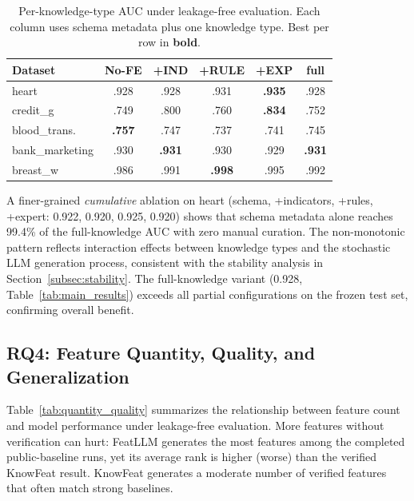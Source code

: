 \begin{table}[t]
\centering
\caption{Per-knowledge-type AUC under leakage-free evaluation. Each column uses schema metadata plus one knowledge type. Best per row in \textbf{bold}.}
\label{tab:pertype}
\small
\renewcommand{\arraystretch}{1.2}
\setlength{\tabcolsep}{3pt}
\begin{tabular}{l c c c c c}
\hline
\textbf{Dataset} & \textbf{No-FE} & \textbf{+IND} & \textbf{+RULE} & \textbf{+EXP} & \textbf{full} \\
\hline
heart              & .928 & .928 & .931 & \textbf{.935} & .928 \\
credit\_g          & .749 & .800 & .760 & \textbf{.834} & .752 \\
blood\_trans.      & \textbf{.757} & .747 & .737 & .741 & .745 \\
bank\_marketing    & .930 & \textbf{.931} & .930 & .929 & \textbf{.931} \\
breast\_w          & .986 & .991 & \textbf{.998} & .995 & .992 \\
\hline
\end{tabular}
\end{table}

A finer-grained \emph{cumulative} ablation on heart (schema, +indicators, +rules, +expert: 0.922, 0.920, 0.925, 0.920) shows that schema metadata alone reaches 99.4\% of the full-knowledge AUC with zero manual curation. The non-monotonic pattern reflects interaction effects between knowledge types and the stochastic LLM generation process, consistent with the stability analysis in Section~\ref{subsec:stability}. The full-knowledge variant (0.928, Table~\ref{tab:main_results}) exceeds all partial configurations on the frozen test set, confirming overall benefit.

\subsection{RQ4: Feature Quantity, Quality, and Generalization}
\label{subsec:rq4}

Table~\ref{tab:quantity_quality} summarizes the relationship between feature count and model performance under leakage-free evaluation. More features without verification can hurt: FeatLLM generates the most features among the completed public-baseline runs, yet its average rank is higher (worse) than the verified KnowFeat result. KnowFeat generates a moderate number of verified features that often match strong baselines.

